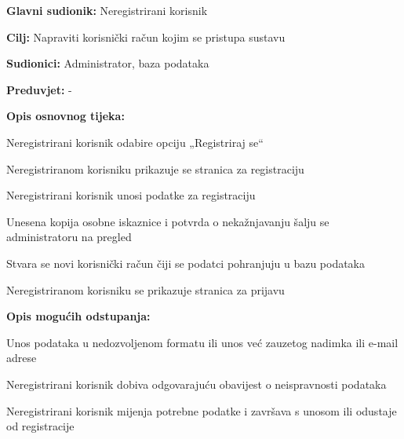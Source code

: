 						\noindent {}
						\begin{packed_item}
							
							\item \textbf{Glavni sudionik: } Neregistrirani korisnik
							\item  \textbf{Cilj:} Napraviti korisnički račun kojim se pristupa sustavu
							\item  \textbf{Sudionici:} Administrator, baza podataka
							\item  \textbf{Preduvjet:} -
							\item  \textbf{Opis osnovnog tijeka:}
							
							\item[] \begin{packed_enum}
								
								\item	Neregistrirani korisnik odabire opciju „Registriraj se“
								\item 	Neregistriranom korisniku prikazuje se stranica za registraciju
							    \item 	Neregistrirani korisnik unosi podatke za registraciju
								\item 	Unesena kopija osobne iskaznice i potvrda o nekažnjavanju šalju se administratoru na pregled
								\item 	Stvara se novi korisnički račun čiji se podatci pohranjuju u bazu podataka
								\item 	Neregistriranom korisniku se prikazuje stranica za prijavu
								
								 
								
							\end{packed_enum}
							
							\item  \textbf{Opis mogućih odstupanja:}
							
							\item[] \begin{packed_item}
								
								\item[3.a] Unos podataka u nedozvoljenom formatu ili unos već zauzetog nadimka ili e-mail adrese
								\item[] \begin{packed_enum}
									
									\item 	Neregistrirani korisnik dobiva odgovarajuću obavijest o neispravnosti podataka
									\item	Neregistrirani korisnik mijenja potrebne podatke i završava s unosom ili odustaje od registracije
									
									
								\end{packed_enum}
								
								
							\end{packed_item}
						\end{packed_item}
